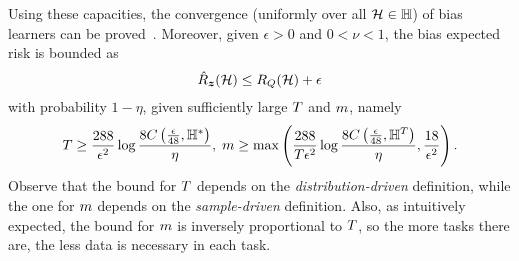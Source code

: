 Using these capacities, the convergence (uniformly over all $\mathcal{H} \in \mathbb{H}$) of bias learners can be proved~\cite[Theorem~2]{baxter2000model}. Moreover, given $\epsilon > 0$ and $0 < \nu < 1$, the bias expected risk is bounded as
\begin{equation}
    \nonumber
    \hat{R}_{\bm{z}}(\mathcal{H}) \leq R_Q(\mathcal{H}) + \epsilon
\end{equation}
with probability $1 - \eta$, given sufficiently large $T$ and $m$, namely
\begin{equation}
    \nonumber
    T \geq \frac{288}{\epsilon^2} \log{\frac{8C\left(\frac{\epsilon}{48}, \mathbb{H}^{*}\right)}{\eta}} , \; m \geq \max \left( \frac{288}{T \epsilon^2} \log\frac{8C\left(\frac{\epsilon}{48}, \mathbb{H}^{T}\right)}{\eta} , \frac{18}{\epsilon^2}\right) .
\end{equation}
Observe that the bound for $T$ depends on the \emph{distribution-driven} definition, while the one for $m$ depends on the \emph{sample-driven} definition.
Also, as intuitively expected, the bound for $m$ is inversely proportional to $T$, so the more tasks there are, the less data is necessary in each task. 

